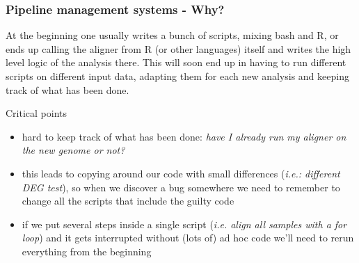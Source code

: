 \documentclass[xcolor=table]{beamer}
\begin{document}
\begin{frame}
\frametitle{Pipeline management systems - Why?}
\begin{tiny}
At the beginning one usually writes a bunch of scripts, mixing bash and R, or ends up calling the aligner from R (or other languages) itself and
writes the high level logic of the analysis there.
This will soon end up in having to run different scripts on different input data, adapting them for each new analysis and keeping track of what has been done.
\end{tiny}

\begin{footnotesize}
\begin{beamerboxesrounded}[upper=upper_box2,lower=lower_box,shadow=true]{Critical points}
\begin{itemize}
\item hard to keep track of what has been done: \emph{have I already run my aligner on the new genome or not?}
\item this leads to copying around our code with small differences (\emph{i.e.: different DEG test}), so when we discover a \textcolor{novak}{bug} somewhere we need to remember to change all the scripts that include the guilty code
\item if we put several steps inside a single script (\emph{i.e. align all samples with a for loop}) and it gets interrupted without (lots of) ad hoc code we'll need to rerun everything from the beginning
\end{itemize}
\end{beamerboxesrounded}
\end{footnotesize}
\end{frame}
\end{document}
